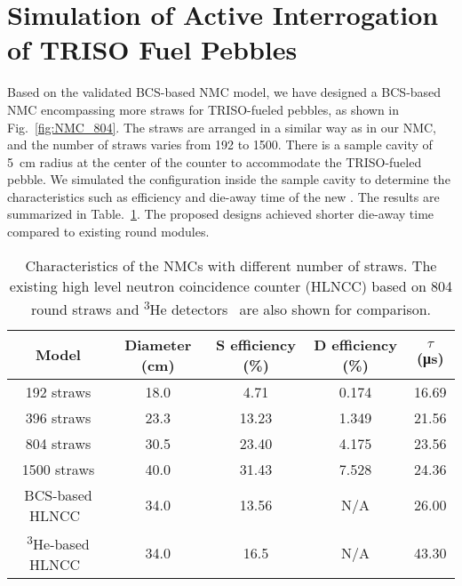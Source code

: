 \documentclass[preprint,final]{elsarticle}
\begin{document}
\section{Simulation of Active Interrogation of TRISO Fuel Pebbles}\label{sec:pebble_interrogation}
Based on the validated BCS-based NMC model, we have designed a BCS-based NMC encompassing more straws for  TRISO-fueled pebbles, as shown in Fig.~\ref{fig:NMC_804}. The straws are arranged in a similar way as in our NMC, and the number of straws varies from 192 to 1500. There is a sample cavity of \SI{5}{cm} radius at the center of the counter to accommodate the TRISO-fueled pebble. We simulated the configuration  inside the sample cavity to determine the characteristics such as efficiency and die-away time of the new . The results are summarized in Table.~\ref{table:NMC_characteristics}. The proposed designs achieved shorter die-away time compared to existing round  modules.

\begin{table}[!htbp]
\centering
\caption{Characteristics of the NMCs with different number of straws. The existing high level neutron coincidence counter (HLNCC) based on 804 round straws and \textsuperscript{3}He detectors~\cite{simone2017performance} are also shown for comparison.}
\label{table:NMC_characteristics}
\scriptsize
\begin{tabular}{ccccc}
\hline
Model & Diameter (cm) & S efficiency (\%) & D efficiency (\%) & $\tau$ (\si{{\micro\second}}) \\ \hline
192 straws             & 18.0             & 4.71                   & 0.174                  & 16.69              \\
396 straws            & 23.3             & 13.23                  & 1.349                  & 21.56              \\
804 straws           & 30.5             & 23.40                  & 4.175                  & 23.56              \\
1500 straws            & 40.0             & 31.43                  & 7.528                  & 24.36              \\
BCS-based HLNCC~\cite{simone2017performance}             & 34.0             & 13.56                  & N/A                    & 26.00 \\
\textsuperscript{3}He-based HLNCC~\cite{simone2017performance}             & 34.0             & 16.5                  & N/A                    & 43.30 \\
\hline
\end{tabular}
\end{table}
\end{document}
